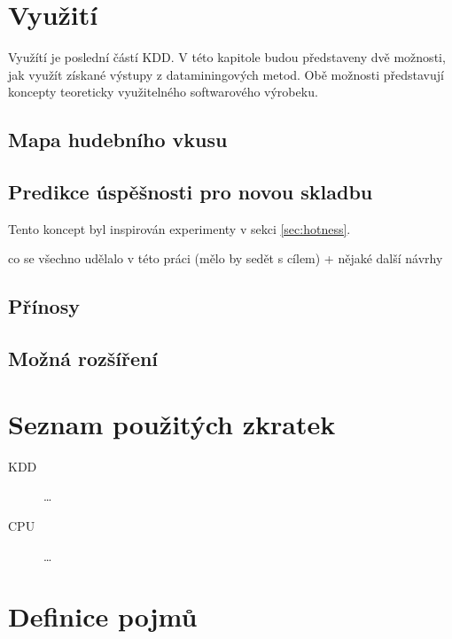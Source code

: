 \documentclass[thesis=M,czech]{FITthesis}[2012/06/26]
\begin{document}
\chapter{Využití}

Využítí je poslední částí KDD. V této kapitole budou představeny dvě možnosti, jak využít získané výstupy z dataminingových metod. Obě možnosti představují koncepty teoreticky využitelného softwarového výrobeku.

\section{Mapa hudebního vkusu}


\section{Predikce úspěšnosti pro novou skladbu}
Tento koncept byl inspirován experimenty v sekci \ref{sec:hotness}. 


\begin{conclusion}
	co se všechno udělalo v této práci (mělo by sedět s cílem)
	+ nějaké další návrhy
	
	\section{Přínosy}
	
	\section{Možná rozšíření}
\end{conclusion}




\appendix

\chapter{Seznam použitých zkratek}
\begin{description}
	\item[KDD] \dots
	\item[CPU] \dots
\end{description}

\chapter{Definice pojmů}
\end{document}
